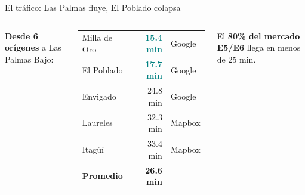 \documentclass[aspectratio=169, 11pt]{beamer}
\newcommand{\highlight}[1]{\textcolor{teal}{\textbf{#1}}}
\begin{document}
\begin{frame}{El tráfico: Las Palmas fluye, El Poblado colapsa}
\begin{columns}[T]
\vspace{6pt}
{\footnotesize\textbf{Desde 6 orígenes} a Las Palmas Bajo:}

\vspace{3pt}
{\scriptsize
\begin{tabular}{@{}lrl@{}}
Milla de Oro & \highlight{15.4 min} & Google \\
El Poblado & \highlight{17.7 min} & Google \\
Envigado & 24.8 min & Google \\
Laureles & 32.3 min & Mapbox \\
Itagüí & 33.4 min & Mapbox \\
\midrule
\textbf{Promedio} & \textbf{26.6 min} & \\
\end{tabular}
}

\vspace{4pt}
{\scriptsize El \textbf{80\% del mercado E5/E6} llega en menos de 25 min.}
\end{columns}
\end{frame}
\end{document}
